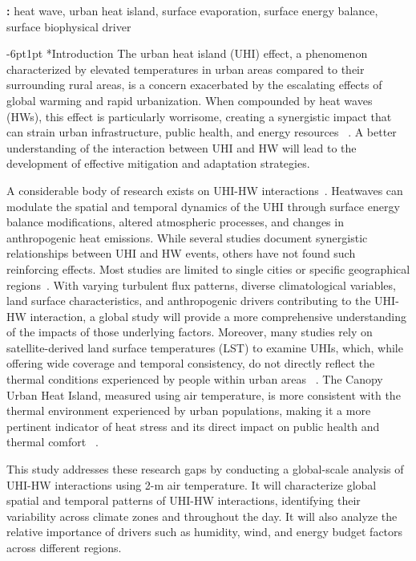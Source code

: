 \documentclass[]{nature}
\makeatletter
\renewcommand{\section}{\@startsection {section}{1}{0pt}%
    {-6pt}{1pt}%
    {\large\sffamily\bfseries}%
    }
\makeatother
\begin{document}
    \noindent\textbf{\keywordstitle:} heat wave, urban heat island, surface evaporation, surface energy balance, surface biophysical driver
    
    
\section*{Introduction}
The urban heat island (UHI) effect, a phenomenon characterized by elevated temperatures in urban areas compared to their surrounding rural areas, is a concern exacerbated by the escalating effects of global warming and rapid urbanization. When compounded by heat waves (HWs), this effect is particularly worrisome, creating a synergistic impact that can strain urban infrastructure, public health, and energy resources\unskip~\cite{2755510:33598912,2755510:33598911} . A better understanding of the interaction between UHI and HW will lead to the development of effective mitigation and adaptation strategies.

A considerable body of research exists on UHI-HW interactions\unskip~\cite{2755510:33598930}. Heatwaves can modulate the spatial and temporal dynamics of the UHI through surface energy balance modifications, altered atmospheric processes, and changes in anthropogenic heat emissions. While several studies document synergistic relationships between UHI and HW events, others have not found such reinforcing effects. Most studies are limited to single cities or specific geographical regions\unskip~\cite{2755510:33598950,2755510:33598949,2755510:33598945,2755510:33598943,2755510:33598941,2755510:33598938,2755510:33598937,2755510:33598935}. With varying turbulent flux patterns, diverse climatological variables, land surface characteristics, and anthropogenic drivers contributing to the UHI-HW interaction, a global study will provide a more comprehensive understanding of the impacts of those underlying factors. Moreover, many studies rely on satellite-derived land surface temperatures (LST) to examine UHIs, which, while offering wide coverage and temporal consistency, do not directly reflect the thermal conditions experienced by people within urban areas\unskip~\cite{2755510:33598945,2755510:33598947} . The Canopy Urban Heat Island, measured using air temperature, is more consistent with the thermal environment experienced by urban populations, making it a more pertinent indicator of heat stress and its direct impact on public health and thermal comfort\unskip~\cite{2755510:33598934} .

This study addresses these research gaps by conducting a global-scale analysis of UHI-HW interactions using 2-m air temperature. It will characterize global spatial and temporal patterns of UHI-HW interactions, identifying their variability across climate zones and throughout the day. It will also analyze the relative importance of drivers such as humidity, wind, and energy budget factors across different regions.
\end{document}
